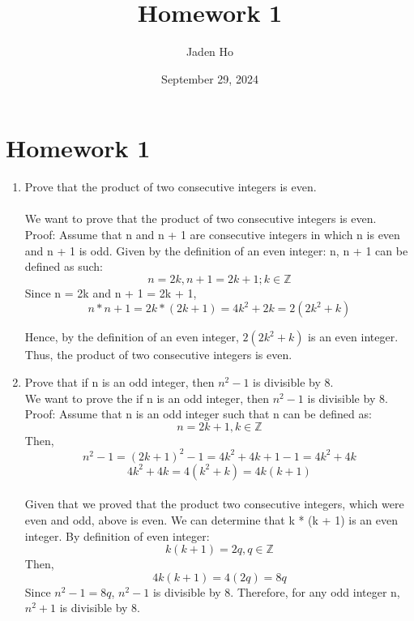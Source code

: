 \documentclass[12pt]{article}
\title{Homework 1}
\author{Jaden Ho}
\date{September 29, 2024}
\begin{document}
\maketitle

\section{Homework 1}
\begin{enumerate}
    \item Prove that the product of two consecutive integers is even. \\
    \\ We want to prove that the product of two consecutive integers is even.
    \\
    Proof: Assume that n and n + 1 are consecutive integers in which n is even and n + 1 is odd. Given by the definition of an even integer: n, n + 1 can be defined as such:
    \begin{equation}
        n = 2k, n + 1 = 2k + 1; k \in \mathbb{Z}
    \end{equation}
    Since n = 2k and n + 1 = 2k + 1, 
    \begin{equation}
        n * n + 1 = 2k * (2k + 1) = 4k^2 + 2k = 2(2k^2 + k)
    \end{equation}

    Hence, by the definition of an even integer, $2(2k^{2} + k)$ is an even integer. Thus, the product of two consecutive integers is even. \qedsymbol{}
    
    \item Prove that if n is an odd integer, then $n^{2} - 1$ is divisible by 8.\\

    We want to prove the if n is an odd integer, then $n^2 -1$ is divisible by 8.
    \\ 
    Proof: Assume that n is an odd integer such that n can be defined as: 
    \begin{equation}
        n = 2k + 1, k \in \mathbb{Z}
    \end{equation}
    Then,
    \begin{equation}
        n^2 - 1 = (2k + 1)^2 - 1 = 4k^2 + 4k + 1 - 1 = 4k^2 + 4k
    \end{equation}
    \begin{equation}
        4k^2 + 4k = 4(k^2 + k) = 4k(k + 1)
    \end{equation}
    \\
    Given that we proved that the product two consecutive integers, which were even and odd, above is even. We can determine that k * (k + 1) is an even integer.
    By definition of even integer:
    \begin{equation}
        k(k + 1) = 2q, q \in \mathbb{Z}
    \end{equation}
    Then, 
    \begin{equation}
        4k(k + 1) = 4(2q) = 8q 
    \end{equation}
    Since $n^2 - 1 = 8q$, $n^2 - 1$ is divisible by 8. Therefore, for any odd integer n, $n^2 + 1$ is divisible by 8. \qedsymbol{}


\end{enumerate}
\end{document}
